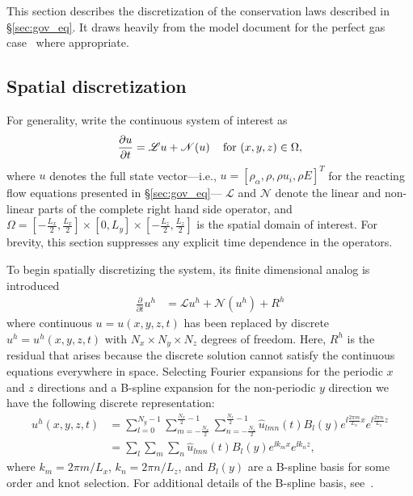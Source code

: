 This section describes the discretization of the conservation laws
described in \S\ref{sec:gov_eq}.  It draws heavily from the model
document for the perfect gas case~\cite{?} where appropriate.

\subsection{Spatial discretization}
For generality, write the continuous system of interest as
%
\begin{equation*}
\frac{\partial u}{\partial t} = \mathscr{L}u + \mathscr{N}\!\left(u\right) \quad \mathrm{for} \,\, (x,y,z) \in \Omega,
\end{equation*}
% 
where $u$ denotes the full state vector---i.e., $u = [\rho_{\alpha},
  \rho, \rho u_i, \rho E]^T$ for the reacting flow equations presented
in \S\ref{sec:gov_eq}--- $\mathscr{L}$ and $\mathscr{N}$ denote the
linear and non-linear parts of the complete right hand side operator,
and $\Omega = \left[-\frac{L_x}{2},\frac{L_x}{2}\right] \times{}
[0,L_y] \times{} \left[-\frac{L_z}{2},\frac{L_z}{2}\right]$ is the
spatial domain of interest.  For brevity, this section suppresses any
explicit time dependence in the operators.

To begin spatially discretizing the system, its finite dimensional
analog is introduced
%
\begin{align}
  \frac{\partial}{\partial{}t} u^h
  &=
  \mathscr{L}u^h + \mathscr{N}\!\left(u^h\right) + R^h
  \label{eq:discrete_system_with_residual}
\end{align}
where continuous $u = u\!\left(x,y,z,t\right)$ has been replaced by
discrete $u^h = u^h\!\left(x,y,z,t\right)$ with
$N_x\times{}N_y\times{}N_z$ degrees of freedom.  Here, $R^h$ is the
residual that arises because the discrete solution cannot satisfy the
continuous equations everywhere in space.  Selecting Fourier
expansions for the periodic $x$ and $z$ directions and a B-spline
expansion for the non-periodic $y$ direction we have the following
discrete representation:
\begin{align}
u^h(x,y,z,t)
&=
  \sum_{l=0}^{N_y - 1}
  \sum_{m=-\frac{N_x}{2}}^{\frac{N_x}{2}-1}
  \sum_{n=-\frac{N_z}{2}}^{\frac{N_z}{2}-1}
  \hat{u}_{l m n}(t)
  B_l\!\left(y\right)
  e^{\ii\frac{2\pi{}m}{L_x}x}
  e^{\ii\frac{2\pi{}n}{L_z}z}
  \\
&=
  \sum_{l}\sum_{m}\sum_{n}
  \hat{u}_{l m n}(t)B_l\!\left(y\right)e^{\ii k_m x}e^{\ii k_n z},
  \label{eq:u_h_expansion}
\end{align}
where $k_m = 2\pi{}m/L_x$, $k_n = 2\pi{}n/L_z$, and
$B_l\!\left(y\right)$ are a B-spline basis for some order and knot
selection.  For additional details of the B-spline basis,
see~\cite{?}.


